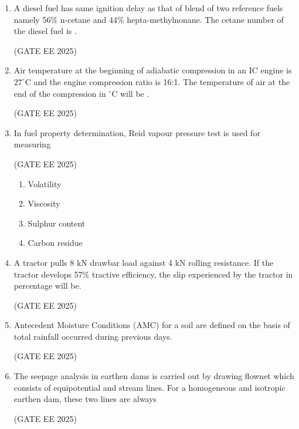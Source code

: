 \documentclass[journal,12pt,onecolumn]{IEEEtran}
\theoremstyle{remark}
\begin{document}
\begin{enumerate}
\item A diesel fuel has same ignition delay as that of blend of two reference fuels namely 56\% n-cetane and 44\% hepta-methylnonane. The cetane number of the diesel fuel is \underline{\hspace{2cm}}.

\hfill(GATE EE 2025)

\item Air temperature at the beginning of adiabatic compression in an IC engine is $27^\circ$C and the engine compression ratio is 16:1. The temperature of air at the end of the compression in $^\circ$C will be \underline{\hspace{2cm}}.

\hfill(GATE EE 2025)

\item In fuel property determination, Reid vapour pressure test is used for measuring

\hfill(GATE EE 2025)

\begin{multicols}{4}
\begin{enumerate}
    \item Volatility
    \item Viscosity
    \item Sulphur content
    \item Carbon residue
\end{enumerate}
\end{multicols}

\item A tractor pulls 8 kN drawbar load against 4 kN rolling resistance. If the tractor develops 57\% tractive efficiency, the slip experienced by the tractor in percentage will be\underline{\hspace{2cm}}. 

\hfill(GATE EE 2025)

\item Antecedent Moisture Conditions (AMC) for a soil are defined on the basis of total rainfall occurred during previous \underline{\hspace{2cm}} days.

\hfill(GATE EE 2025)

\item The seepage analysis in earthen dams is carried out by drawing flownet which consists of equipotential and stream lines. For a homogeneous and isotropic earthen dam, these two lines are always

\hfill(GATE EE 2025)


\end{enumerate}
\end{document}
